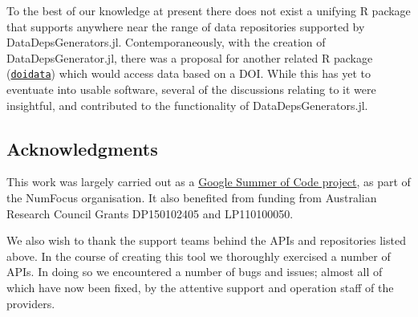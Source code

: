 \documentclass{book}
\begin{document}
To the best of our knowledge at present there does not exist a unifying
R package that supports anywhere near the range of data repositories
supported by DataDepsGenerators.jl. Contemporaneously, with the creation
of DataDepsGenerator.jl, there was a proposal for another related R
package
(\href{https://github.com/ropenscilabs/doidata}{\texttt{doidata}}) which
would access data based on a DOI. While this has yet to eventuate into
usable software, several of the discussions relating to it were
insightful, and contributed to the functionality of
DataDepsGenerators.jl.

\subsection{Acknowledgments}
This work was largely carried out as a
\href{https://medium.com/@sebastinsanty/google-summer-of-code-2018-julia-computing-report-8d3f553d7050}{Google
	Summer of Code project}, as part of the NumFocus organisation. It also
benefited from funding from Australian Research Council Grants
DP150102405 and LP110100050.

We also wish to thank the support teams behind the APIs and repositories
listed above. In the course of creating this tool we thoroughly
exercised a number of APIs. In doing so we encountered a number of bugs
and issues; almost all of which have now been fixed, by the attentive
support and operation staff of the providers.
\end{document}
